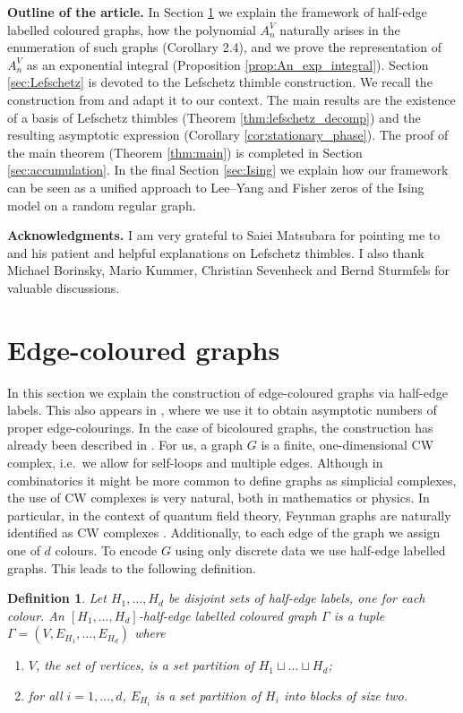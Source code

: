 \documentclass[11pt, a4paper]{article}
\numberwithin{theorem}{section}
\newtheorem{definition}[theorem]{Definition}
\theoremstyle{remark}
\theoremstyle{theorem}
\begin{document}
\textbf{Outline of the article.} In Section \ref{sec:graphs} we explain the framework of half-edge labelled coloured graphs, how the polynomial $A_n^V$ naturally arises in the enumeration of such graphs (Corollary 2.4), and we prove the representation of $A_n^V$ as an exponential integral (Proposition \ref{prop:An_exp_integral}). Section \ref{sec:Lefschetz} is devoted to the Lefschetz thimble construction. We recall the construction from \cite{matsubara2023localization} and adapt it to our context. The main results are the existence of a basis of Lefschetz thimbles (Theorem \ref{thm:lefschetz_decomp}) and the resulting asymptotic expression (Corollary \ref{cor:stationary_phase}). The proof of the main theorem (Theorem \ref{thm:main}) is completed in Section \ref{sec:accumulation}. In the final Section \ref{sec:Ising} we explain how our framework can be seen as a unified approach to Lee--Yang and Fisher zeros of the Ising model on a random regular graph.\par

\textbf{Acknowledgments.} I am very grateful to Saiei Matsubara for pointing me to \cite{matsubara2023localization} and his patient and helpful explanations on Lefschetz thimbles. I also thank Michael Borinsky, Mario Kummer, Christian Sevenheck and Bernd Sturmfels for valuable discussions.

\section{Edge-coloured graphs}
\label{sec:graphs}

In this section we explain the construction of edge-coloured graphs via half-edge labels. This also appears in \cite{multicolor}, where we use it to obtain asymptotic numbers of proper edge-colourings. In the case of bicoloured graphs, the construction has already been described in \cite{BMW}.
For us, a graph $G$ is a finite, one-dimensional CW complex, i.e.\ we allow for self-loops and multiple edges. Although in combinatorics it might be more common to define graphs as simplicial complexes, the use of CW complexes is very natural, both in mathematics or physics. 
In particular, in the context of quantum field theory, Feynman graphs are naturally identified as CW complexes \cite{bessis1980quantum}. 
Additionally, to each edge of the graph we assign one of $d$ colours.
To encode $G$ using only discrete data we use half-edge labelled graphs.
This leads to the following definition.

\begin{definition}
  \label{def:multicolored_half_edge_label}
  Let $H_1,\dots,H_d$ be disjoint sets of half-edge labels, one for each colour. An $[H_1,\dots,H_d]$-\emph{half-edge labelled coloured graph} $\Gamma$ is a tuple $\Gamma = (V, E_{H_1},\dots, E_{H_d})$ where 
  \begin{enumerate}
    \item $V$, the set of vertices, is a set partition of $H_1 \sqcup \dots \sqcup H_d$;
    \item for all $i=1,\dots,d$, $E_{H_i}$ is a set partition of $H_i$ into blocks of size two.
  \end{enumerate}
\end{definition}
\end{document}
